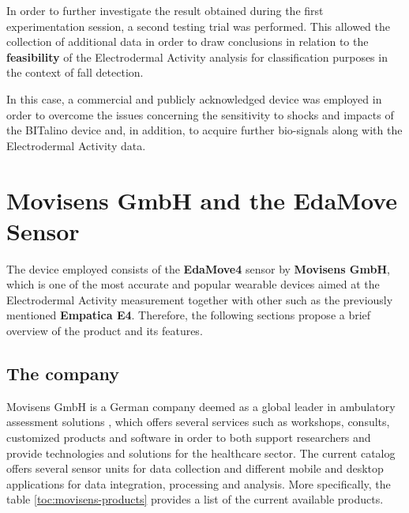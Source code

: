 \label{ch:collection}

%
%

In order to further investigate the result obtained during the first experimentation session, a second testing trial was performed. This allowed the collection of additional data in order to draw conclusions in relation to the \textbf{feasibility} of the Electrodermal Activity analysis for classification purposes in the context of fall detection.

In this case, a commercial and publicly acknowledged device was employed in order to overcome the issues concerning the sensitivity to shocks and impacts of the BITalino device and, in addition, to acquire further bio-signals along with the Electrodermal Activity data.

\section{Movisens GmbH and the EdaMove Sensor}\label{sec:movisens}

The device employed consists of the \textbf{EdaMove4} sensor by \textbf{Movisens GmbH}, which is one of the most accurate and popular wearable devices aimed at the Electrodermal Activity measurement together with other such as the previously mentioned \textbf{Empatica E4}. Therefore, the following sections propose a brief overview of the product and its features.

\subsection{The company}\label{subsec:movisens-company}


Movisens GmbH is a German company deemed as a global leader in ambulatory assessment solutions \cite{movisens}, which offers several services such as workshops, consults, customized products and software in order to both support researchers and provide technologies and solutions for the healthcare sector.
The current catalog offers several sensor units for data collection and different mobile and desktop applications for data integration, processing and analysis. More specifically, the table \ref{toc:movisens-products} provides a list of the current available products.

